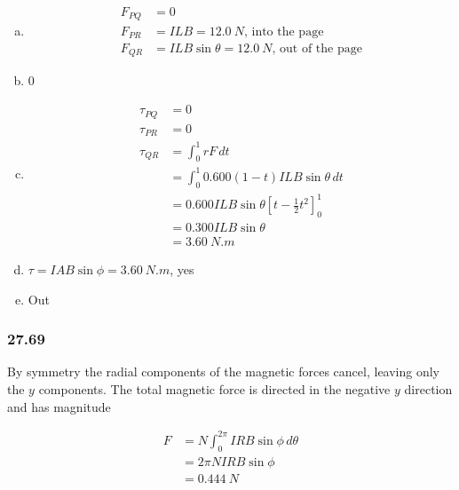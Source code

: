 \documentclass{article}
\begin{document}
\begin{enumerate}[(a)]
  \item

        \begin{align*}
          F_{PQ} & = 0                                                            \\
          F_{PR} & = I L B = \qty{12.0}{N} \textrm{, into the page}               \\
          F_{QR} & = I L B \sin \theta = \qty{12.0}{N} \textrm{, out of the page}
        \end{align*}

  \item 0

  \item

        \begin{align*}
          \tau_{PQ} & = 0                                                              \\
          \tau_{PR} & = 0                                                              \\
          \tau_{QR} & = \int_0^1 r F \,dt                                              \\
                    & = \int_0^1 0.600 (1 - t) I L B \sin \theta \,dt                  \\
                    & = 0.600 I L B \sin \theta \left[ t - \frac{1}{2} t^2 \right]_0^1 \\
                    & = 0.300 I L B \sin \theta                                        \\
                    & = \qty{3.60}{N.m}
        \end{align*}

  \item $\tau = I A B \sin \phi = \qty{3.60}{N.m}$, yes

  \item Out
\end{enumerate}

\subsubsection{27.69}

By symmetry the radial components of the magnetic forces cancel, leaving only the $y$ components. The total magnetic force is directed in the negative $y$ direction and has magnitude

\begin{align*}
  F & = N \int_0^{2 \pi} I R B \sin \phi \,d\theta \\
    & = 2 \pi N I R B \sin \phi                    \\
    & = \qty{0.444}{N}
\end{align*}
\end{document}
